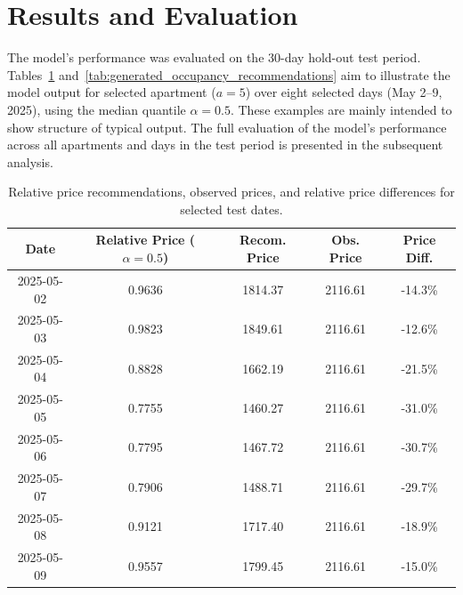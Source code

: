 \section{Results and Evaluation}
\label{sec:results}
The model's performance was evaluated on the 30-day hold-out test period. Tables~\ref{tab:generated_price_recommendations} and~\ref{tab:generated_occupancy_recommendations} aim to illustrate the model output for selected apartment ($a=5$) over eight selected days (May 2–9, 2025), using the median quantile $\alpha=0.5$. These examples are mainly intended to show structure of typical output. The full evaluation of the model's performance across all apartments and days in the test period is presented in the subsequent analysis.

\begin{table}[ht]
    \centering
    \small
    \begin{tabular}{|c|c|c|c|c|}
        \hline
        Date       & Relative Price ($\alpha=0.5$) & Recom. Price & Obs. Price & Price Diff. \\
        \hline
        2025-05-02 & 0.9636                        & 1814.37      & 2116.61    & -14.3\%     \\
        2025-05-03 & 0.9823                        & 1849.61      & 2116.61    & -12.6\%     \\
        2025-05-04 & 0.8828                        & 1662.19      & 2116.61    & -21.5\%     \\
        2025-05-05 & 0.7755                        & 1460.27      & 2116.61    & -31.0\%     \\
        2025-05-06 & 0.7795                        & 1467.72      & 2116.61    & -30.7\%     \\
        2025-05-07 & 0.7906                        & 1488.71      & 2116.61    & -29.7\%     \\
        2025-05-08 & 0.9121                        & 1717.40      & 2116.61    & -18.9\%     \\
        2025-05-09 & 0.9557                        & 1799.45      & 2116.61    & -15.0\%     \\
        \hline
    \end{tabular}
    \caption{Relative price recommendations, observed prices, and relative price differences for selected test dates.}
    \label{tab:generated_price_recommendations}
\end{table}

